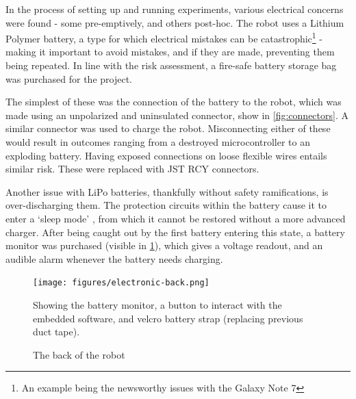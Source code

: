 \documentclass[main.tex]{subfiles}
\begin{document}
In the process of setting up and running experiments, various electrical concerns were found - some pre-emptively, and others post-hoc. The robot uses a Lithium Polymer battery, a type for which electrical mistakes can be catastrophic\footnote{An example being the newsworthy \cite{bbc-samsung-explosion} issues with the Galaxy Note 7} - making it important to avoid mistakes, and if they are made, preventing them being repeated. In line with the risk assessment, a fire-safe battery storage bag was purchased for the project.

The simplest of these was the connection of the battery to the robot, which was made using an unpolarized and uninsulated connector, show in \cref{fig:connectors}. A similar connector was used to charge the robot. Misconnecting either of these would result in outcomes ranging from a destroyed microcontroller to an exploding battery. Having exposed connections on loose flexible wires entails similar risk. These were replaced with JST RCY connectors.

Another issue with LiPo batteries, thankfully without safety ramifications, is over-discharging them. The protection circuits within the battery cause it to enter a `sleep mode' \cite{lipo-sleep-mode}, from which it cannot be restored without a more advanced charger. After being caught out by the first battery entering this state, a battery monitor was purchased (visible in \cref{fig:robot-back}), which gives a voltage readout, and an audible alarm whenever the battery needs charging.

\begin{figure}
	\centering
	\texttt{[image: figures/electronic-back.png]}
	\caption{The back of the robot}
	\label{fig:robot-back}
	\medskip
	\small
	Showing the battery monitor, a button to interact with the embedded software, and velcro battery strap
	(replacing previous duct tape).
\end{figure}
\end{document}
